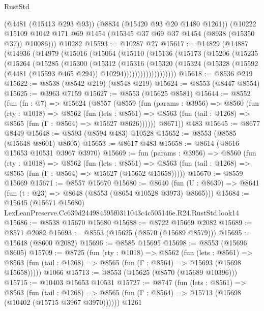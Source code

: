 \begin{lexlean}{RustStd}
\begin{coremodule}
      (@4481 (@15413 @293 @93))
      (@8834 (@15420 @93 @20 @1480 @1261))
      (@10222 @15109 @1042 @171 @69 @1454 (@15345 @37 @69 @37 @1454 (@8938 (@15350 @37)) @10086)))
    @10282
@15593 := @10287 @27
@15617 := @14829
    (@14887
      (@14936
        (@14979
          (@15016
            (@15064
              (@15110
                (@15136
                  (@15173
                    (@15206
                      (@15235
                        (@15264
                          (@15285
                            (@15300
                              (@15312
                                (@15316
                                  (@15320
                                    (@15324
                                      (@15328
                                        (@15592 (@4481 (@15593 @465 @294)) @10294)))))))))))))))))))
@15618 := @8536 @219
@15622 := @8538 (@8542 @219) (@8548 @219)
@15624 := @8553 (@8447 @8554)
@15625 := @3963 @7159
@15627 := @8553 (@15625 @8581)
@15644 := @8552
    (fun (fn : @7) =>
    @15624
      (@8557
        (@8559
          (fun (params : @3956) =>
          @8560
            (fun (rty : @1018) =>
            @8562
              (fun (lets : @8561) =>
              @8563 (fun (tail : @1268) => @8565 (fun (Γ : @8564) => @15627 @8626))))))
        @8671))
    @483
@15645 := @8677 @8449
@15648 := @8593 (@8594 @483) @10528
@15652 := @8553 (@8585 (@15648 @8601) @8605)
@15653 := @8617 @483
@15658 := @8614 (@8616 @15653 @10531 @3967 @3970)
@15669 := fun (params : @3956) =>
  @8560
    (fun (rty : @1018) =>
    @8562
      (fun (lets : @8561) =>
      @8563 (fun (tail : @1268) => @8565 (fun (Γ : @8564) => @15627 (@15652 @15658)))))
@15670 := @8559 @15669
@15671 := @8557 @15670
@15680 := @8640
    (fun (U : @8639) => @8641 (fun (t : @23) => @8648 (@8553 (@8654 @10528 @3973) @8665)))
@15684 := @15645
    (@15671 @15680)
    LexLeanPreserve.Cc639d244984595f0311043c4c505146e.R24.RustStd.look14
@15686 := @8538 @15670 @15680
@15688 := @8722 @15669 @2082
@15689 := @8571 @2082
@15693 := @8553 (@15625 (@8570 (@15689 @8579)))
@15695 := @15648 (@8600 @2082)
@15696 := @8585 @15695
@15698 := @8553 (@15696 @8605)
@15709 := @8725
    (fun (rty : @1018) =>
    @8562
      (fun (lets : @8561) =>
      @8563 (fun (tail : @1268) => @8565 (fun (Γ : @8564) => @15693 (@15698 @15658)))))
    @1066
@15713 := @8553 (@15625 (@8570 (@15689 @10396)))
@15715 := @10403 @15653 @10531
@15727 := @8747
    (fun (lets : @8561) =>
    @8563
      (fun (tail : @1268) =>
      @8565 (fun (Γ : @8564) => @15713 (@15698 (@10402 (@15715 @3967 @3970))))))
    @1261

\end{coremodule}
\end{lexlean}
